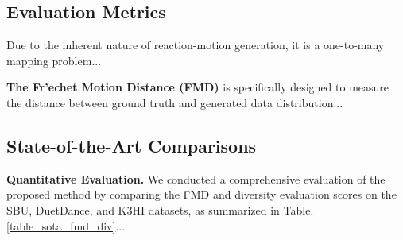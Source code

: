 \subsection{Evaluation Metrics}
\label{evaluation}

Due to the inherent nature of reaction-motion generation, it is a one-to-many mapping problem...

\noindent
\textbf{The Fr'echet Motion Distance (FMD)} is specifically designed to measure the distance between ground truth and generated data distribution...



\subsection{State-of-the-Art Comparisons}
\label{sota}

\noindent
\textbf{Quantitative Evaluation.} We conducted a comprehensive evaluation of the proposed method by comparing the FMD and diversity evaluation scores on the SBU, DuetDance, and K3HI datasets, as summarized in Table. \ref{table_sota_fmd_div}...






